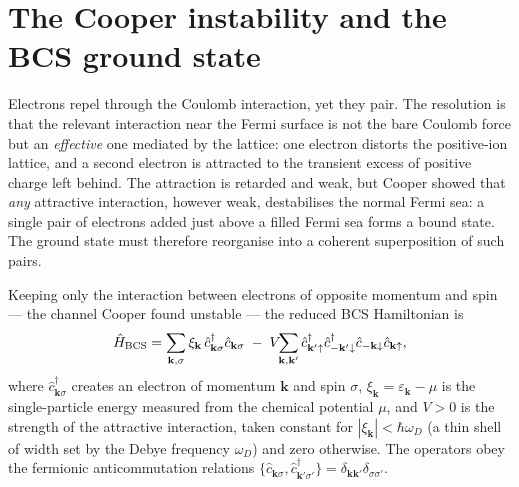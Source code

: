 \section{The Cooper instability and the BCS ground state}
\label{sec:cooper-bcs}

\begin{phenomenon}
Electrons repel through the Coulomb interaction, yet they pair. The
resolution is that the relevant interaction near the Fermi surface is
not the bare Coulomb force but an \emph{effective} one mediated by
the lattice: one electron distorts the positive-ion lattice, and a
second electron is attracted to the transient excess of positive
charge left behind. The attraction is retarded and weak, but Cooper
showed that \emph{any} attractive interaction, however weak,
destabilises the normal Fermi sea: a single pair of electrons added
just above a filled Fermi sea forms a bound state. The ground state
must therefore reorganise into a coherent superposition of such
pairs.
\end{phenomenon}

\begin{statement}
\label{stmt:bcs-hamiltonian}
Keeping only the interaction between electrons of opposite momentum
and spin --- the channel Cooper found unstable --- the reduced BCS
Hamiltonian is
\begin{equation}
\label{eq:bcs-hamiltonian}
\hat{H}_{\rm BCS}
= \sum_{\mathbf k,\sigma}\xi_{\mathbf k}\,
  \hat c^\dagger_{\mathbf k\sigma}\hat c_{\mathbf k\sigma}
\;-\; V\!\!\sum_{\mathbf k,\mathbf k'}
  \hat c^\dagger_{\mathbf k'\uparrow}\hat c^\dagger_{-\mathbf k'\downarrow}
  \hat c_{-\mathbf k\downarrow}\hat c_{\mathbf k\uparrow},
\end{equation}
where $\hat c^\dagger_{\mathbf k\sigma}$ creates an electron of
momentum $\mathbf k$ and spin $\sigma$, $\xi_{\mathbf k}=
\varepsilon_{\mathbf k}-\mu$ is the single-particle energy measured
from the chemical potential $\mu$, and $V>0$ is the strength of the
attractive interaction, taken constant for
$|\xi_{\mathbf k}|<\hbar\omega_D$ (a thin shell of width set by the
Debye frequency $\omega_D$) and zero otherwise. The operators obey
the fermionic anticommutation relations
$\{\hat c_{\mathbf k\sigma},\hat c^\dagger_{\mathbf k'\sigma'}\}
=\delta_{\mathbf k\mathbf k'}\delta_{\sigma\sigma'}$.
\end{statement}

